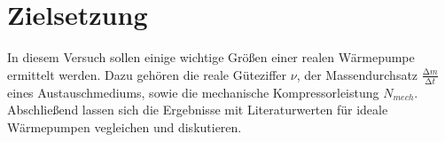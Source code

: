 \section{Zielsetzung}
\label{sec:Zielsetzung}
In diesem Versuch sollen einige wichtige Größen einer realen Wärmepumpe ermittelt werden.
Dazu gehören die reale Güteziffer $\nu$, der Massendurchsatz $\frac{\increment m}{\increment t}$ eines Austauschmediums,
sowie die mechanische Kompressorleistung $N_{mech}$. Abschließend lassen sich die Ergebnisse
mit Literaturwerten für ideale Wärmepumpen vegleichen und diskutieren.
